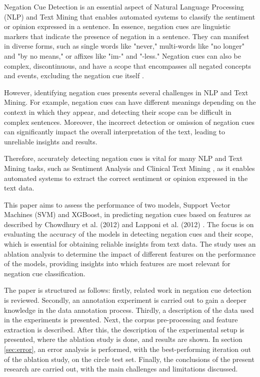 Negation Cue Detection is an essential aspect of Natural Language Processing (NLP) and Text Mining that enables automated systems to classify the sentiment or opinion expressed in a sentence. In essence, negation cues are linguistic markers that indicate the presence of negation in a sentence. They can manifest in diverse forms, such as single words like "never," multi-words like "no longer" and "by no means," or affixes like "im-" and "-less." Negation cues can also be complex, discontinuous, and have a scope that encompasses all negated concepts and events, excluding the negation cue itself \cite{jbara-2012}. 


However, identifying negation cues presents several challenges in NLP and Text Mining. For example, negation cues can have different meanings depending on the context in which they appear, and detecting their scope can be difficult in complex sentences. Moreover, the incorrect detection or omission of negation cues can significantly impact the overall interpretation of the text, leading to unreliable insights and results.


Therefore, accurately detecting negation cues is vital for many NLP and Text Mining tasks, such as Sentiment Analysis \cite{cruz2016machine} and Clinical Text Mining \cite{mehrabi2015deepen}, as it enables automated systems to extract the correct sentiment or opinion expressed in the text data. 

This paper aims to assess the performance of two models, Support Vector Machines (SVM) and XGBoost, in predicting negation cues based on features as described by Chowdhury et al. (2012) and Lapponi et al. (2012) \cite{chowdhury2012fbk, lapponi2012uio}. The focus is on evaluating the accuracy of the models in detecting negation cues and their scope, which is essential for obtaining reliable insights from text data. The study uses an ablation analysis to determine the impact of different features on the performance of the models, providing insights into which features are most relevant for negation cue classification.


 The paper is structured as follows: firstly, related work in negation cue detection is reviewed. Secondly, an annotation experiment is carried out to gain a deeper knowledge in the data annotation process. Thirdly, a description of the data used in the experiments is presented. Next, the corpus pre-processing and feature extraction is described. After this, the description of the experimental setup is presented, where the ablation study is done, and results are shown. In section \ref{sec:error}, an error analysis is performed, with the best-performing iteration out of the ablation study, on the circle test set. Finally, the conclusions of the present research are carried out, with the main challenges and limitations discussed.

